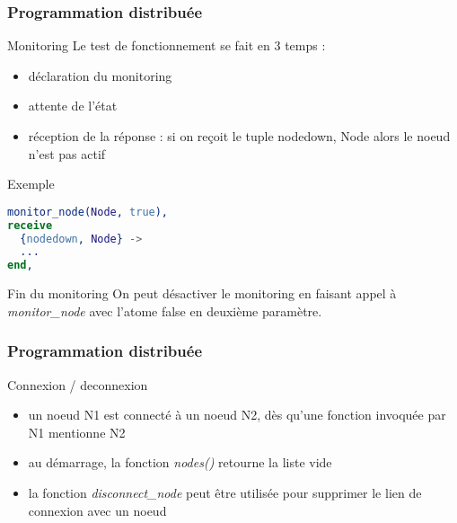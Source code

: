 \begin{frame}[fragile]
  \frametitle{Programmation distribuée}

  \begin{block}{Monitoring}
    Le test de fonctionnement se fait en 3 temps :
    \begin{itemize}
    \item déclaration du monitoring
    \item attente de l'état
    \item réception de la réponse : si on reçoit le tuple {nodedown, Node}
      alors le noeud n'est pas actif
    \end{itemize}
  \end{block}

  \begin{exampleblock}{Exemple}
    \begin{lstlisting}[language=erlang]
monitor_node(Node, true),
receive
  {nodedown, Node} ->
  ...
end,
    \end{lstlisting}
  \end{exampleblock}

  \begin{block}{Fin du monitoring}
    On peut désactiver le monitoring en faisant appel à \textit{monitor\_node}
    avec l'atome false en deuxième paramètre.
  \end{block}

\end{frame}

\begin{frame}[fragile]
  \frametitle{Programmation distribuée}

  \begin{block}{Connexion / deconnexion}
    \begin{itemize}
    \item un noeud N1 est connecté à un noeud N2, dès qu'une fonction
      invoquée par N1 mentionne N2
    \item au démarrage, la fonction \textit{nodes()} retourne la liste vide
    \item la fonction \textit{disconnect\_node} peut être utilisée pour
      supprimer le lien de connexion avec un noeud
    \end{itemize}
  \end{block}

\end{frame}

